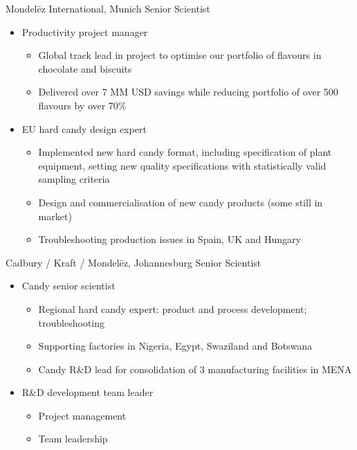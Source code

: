 \documentclass[%
               doublesided,
               paper=a4,
               fontsize=10pt
              ]{my-resume}
\begin{document}
{    
        {Mondelēz International, Munich}
        {Senior Scientist}
        {\begin{itemize}
            \item Productivity project manager
            \begin{itemize}
                \item Global track lead in project to optimise our
                  portfolio of flavours in chocolate and biscuits
                \item Delivered over 7 MM USD savings while reducing
                  portfolio of over 500 flavours by over 70\%
            \end{itemize}
            \item EU hard candy design expert
            \begin{itemize}
                \item Implemented new hard candy format, including
                  specification of plant equipment, setting new
                  quality specifications with statistically valid
                  sampling criteria
                \item Design and commercialisation of new candy
                  products (some still in market)
                \item Troubleshooting production issues in Spain, UK
                  and Hungary
            \end{itemize}
        \end{itemize}}
    
        {Cadbury / Kraft / Mondelēz, Johannesburg}
        {Senior Scientist}
        {\begin{itemize}
            \item Candy senior scientist
            \begin{itemize}
                \item Regional hard candy expert: product and process
                  development; troubleshooting
                \item Supporting factories in Nigeria, Egypt,
                  Swaziland and Botswana
                \item Candy R\&D lead for consolidation of 3
                  manufacturing facilities in MENA
            \end{itemize}
            \item R\&D development team leader
            \begin{itemize}
                \item Project management
                \item Team leadership
            \end{itemize}
        \end{itemize}}
    
}
\end{document}
